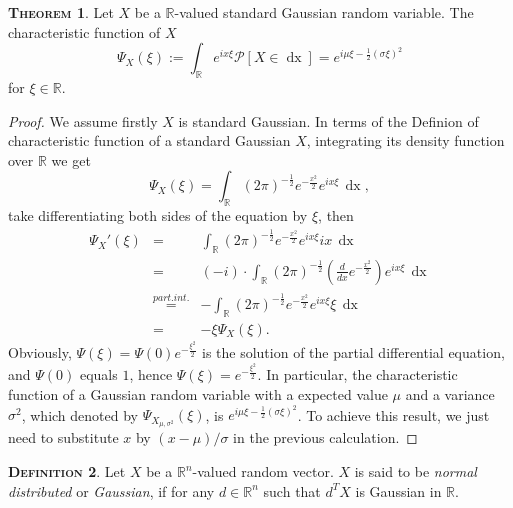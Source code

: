 \documentclass[a4paper, twoside, 11pt]{article}
\theoremstyle{definition}
\newtheorem{definition}{\scshape Definition}[section]
\newtheorem{theorem}[definition]{\scshape Theorem}
\newcommand{\sqbr}[1]{\left[ {#1} \right]}
\begin{document}
\begin{theorem}
  Let $X$ be a $\mathbb{R}$-valued standard Gaussian random variable. The characteristic function of $X$
\begin{equation}
  \Psi_X(\xi) := \int_\mathbb{R} e^{ix\xi}\mathcal{P}\sqbr{X \in \mathop{dx}} = e^{i\mu\xi-\frac{1}{2}(\sigma\xi)^2}
  \label{sec:cht}
\end{equation}
for $\xi \in \mathbb{R}$.
\label{sec:char}
\end{theorem}
\begin{proof}
  We assume firstly $X$ is standard Gaussian. In terms of the Definion of characteristic function of a standard Gaussian $X$, integrating its density function over $\mathbb{R}$ we get
  \begin{equation*}
	\Psi_X(\xi) = \int_\mathbb{R} (2\pi)^{-\frac{1}{2}}e^{-\frac{x^2}{2}}e^{ix\xi}\,\mathop{dx},
  \end{equation*}
take differentiating both sides of the equation by $\xi$, then
\begin{eqnarray*}
\Psi_X'(\xi) &=& \int_\mathbb{R}(2\pi)^{-\frac{1}{2}}e^{-\frac{x^2}{2}}e^{ix\xi}ix\,\mathop{dx}\\
             &=& (-i)\cdot\int_\mathbb{R} (2\pi)^{-\frac{1}{2}}(\frac{d}{dx}e^{-\frac{x^2}{2}})e^{ix\xi}\,\mathop{dx}\\
			 &\overset{part.int.}{=}& -\int_\mathbb{R}(2\pi)^{-\frac{1}{2}}e^{-\frac{x^2}{2}}e^{ix\xi}\xi\,\mathop{dx}\\
			 &=& -\xi\Psi_X(\xi).
\end{eqnarray*}
Obviously, 
$\Psi(\xi) = \Psi(0)e^{-\frac{\xi^2}{2}}$ is the solution of the partial differential equation, and $\Psi(0)$ equals $1$, hence $\Psi(\xi) = e^{-\frac{\xi^2}{2}}$.
In particular, the characteristic function of a Gaussian random variable with a expected value $\mu$ and a variance $\sigma^2$, which denoted by $\Psi_{X_{\mu,\sigma^2}}(\xi)$, is $e^{i\mu\xi-\frac{1}{2}(\sigma\xi)^2}$. To achieve this result, we just need to substitute $x$ by $(x-\mu)/\sigma$ in the previous calculation. 
\end{proof}

\begin{definition}
  Let $X$ be a $\mathbb{R}^{n}$-valued random vector. $X$ is said to be \emph{normal distributed} or \emph{Gaussian}, if for any $d \in \mathbb{R}^{n}$ such that $d^TX$ is Gaussian in $\mathbb{R}$.
  \label{sec:g1}
\end{definition}
\end{document}

